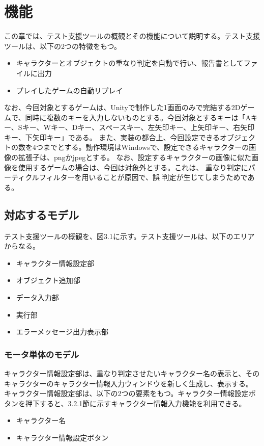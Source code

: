 \chapter{機能}\label{cha:ExistingRETUSS}

この章では、テスト支援ツールの概観とその機能について説明する。テスト支援ツールは、以下の2つの特徴をもつ。
\begin{itemize}
	\item キャラクターとオブジェクトの重なり判定を自動で行い、報告書としてファイルに出力
	\item プレイしたゲームの自動リプレイ
\end{itemize}

なお、今回対象とするゲームは、Unityで制作した1画面のみで完結する2Dゲームで、同時に複数のキーを入力しないものとする。今回対象とするキーは「Aキー、Sキー、Wキー、Dキー、スペースキー、左矢印キー、上矢印キー、右矢印キー、下矢印キー」である。
また、実装の都合上、今回設定できるオブジェクトの数を4つまでとする。動作環境はWindowsで、設定できるキャラクターの画像の拡張子は、pngかjpegとする。
なお、設定するキャラクターの画像に似た画像を使用するゲームの場合は、今回は対象外とする。これは、
重なり判定にパーティクルフィルターを用いることが原因で、誤
判定が生じてしまうためである。


\section{対応するモデル}\label{pre_kinou}
テスト支援ツールの概観を、図3.1に示す。テスト支援ツールは、以下のエリアからなる。\\
\begin{itemize}
	\item キャラクター情報設定部
	\item オブジェクト追加部
	\item データ入力部
	\item 実行部
	\item エラーメッセージ出力表示部
\end{itemize}


\subsection{モータ単体のモデル}\label{sec:sub1}
キャラクター情報設定部は、重なり判定させたいキャラクター名の表示と、そのキャラクターのキャラクター情報入力ウィンドウを新しく生成し、表示する。
キャラクター情報設定部は、以下の2つの要素をもつ。キャラクター情報設定ボタンを押下すると、3.2.1節に示すキャラクター情報入力機能を利用できる。
\begin{itemize}
	\item キャラクター名
	\item キャラクター情報設定ボタン
\end{itemize}

